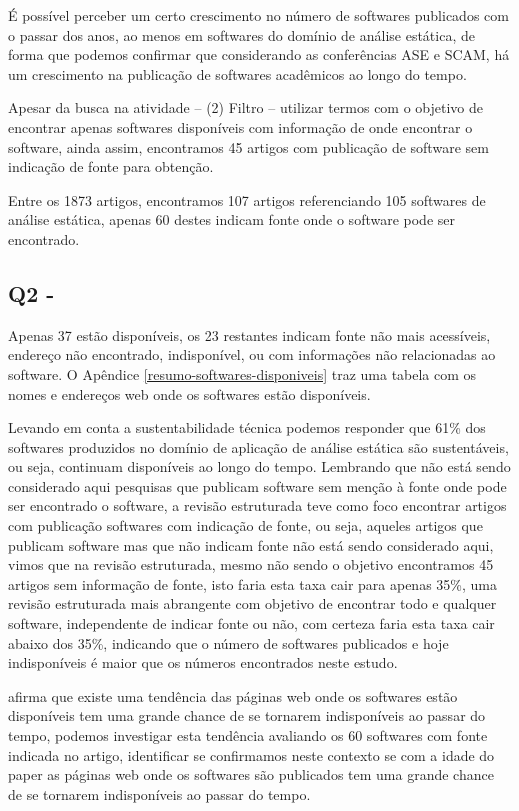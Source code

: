 É possível perceber um certo crescimento no número de softwares publicados com
o passar dos anos, ao menos em softwares do domínio de análise estática, de
forma que podemos confirmar que considerando as conferências ASE e SCAM, há um
crescimento na publicação de softwares acadêmicos ao longo do tempo.

Apesar da busca na atividade -- (2) Filtro -- utilizar termos com o objetivo de
encontrar apenas softwares disponíveis com informação de onde encontrar o
software, ainda assim, encontramos 45 artigos com publicação de software sem
indicação de fonte para obtenção.

Entre os 1873 artigos, encontramos 107 artigos referenciando 105 softwares de
análise estática, apenas 60 destes indicam fonte onde o software pode ser
encontrado.

\subsection{Q2 - \QuestaoDois}

Apenas 37 estão disponíveis, os 23 restantes indicam fonte não mais
acessíveis, endereço não encontrado, indisponível, ou com informações não
relacionadas ao software. O Apêndice \ref{resumo-softwares-disponiveis} traz
uma tabela com os nomes e endereços web onde os softwares estão disponíveis.

Levando em conta a sustentabilidade técnica podemos responder que 61\% dos
softwares produzidos no domínio de aplicação de análise estática são
sustentáveis, ou seja, continuam disponíveis ao longo do tempo. Lembrando que
não está sendo considerado aqui pesquisas que publicam software sem menção à
fonte onde pode ser encontrado o software, a revisão estruturada teve como foco encontrar
artigos com publicação softwares com indicação de fonte, ou seja, aqueles
artigos que publicam software mas que não indicam fonte não está sendo
considerado aqui, vimos que na revisão estruturada, mesmo não sendo o objetivo
encontramos 45 artigos sem informação de fonte, isto faria esta taxa cair para
apenas 35\%, uma revisão estruturada mais abrangente com objetivo de encontrar
todo e qualquer software, independente de indicar fonte ou não, com certeza
faria esta taxa cair abaixo dos 35\%, indicando que o número de softwares
publicados e hoje indisponíveis é maior que os números encontrados neste estudo.

 afirma que existe uma tendência das páginas
web onde os softwares estão disponíveis tem uma grande chance de se tornarem
indisponíveis ao passar do tempo, podemos investigar esta tendência 
avaliando os 60 softwares com fonte indicada no artigo,
identificar se confirmamos neste contexto se com a idade do paper
as páginas web onde os softwares são publicados tem uma grande chance de se
tornarem indisponíveis ao passar do tempo.

